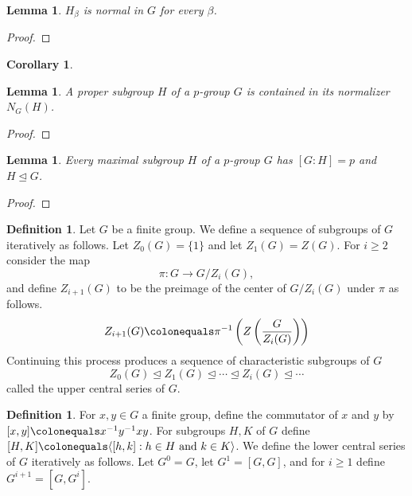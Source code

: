 \documentclass{dcthesis}
\newcommand{\defi}[1]{\textsf{#1}}
\numberwithin{equation}{section}
\newtheorem{lemma}[equation]{Lemma}
\newtheorem{corr}[equation]{Corollary}
\theoremstyle{definition}
\newtheorem{definition}[equation]{Definition}
\theoremstyle{remark}
\begin{document}
{{\begin{lemma}
      $H_\beta$ is normal in $G$ for every $\beta$.
    \end{lemma}
    \begin{proof}
    \end{proof}
    \begin{corr}
      \label{cor:normalsubgroupsofallorders}
    \end{corr}
    \begin{lemma}
      \label{lem:propersubgroupcontainedinnormalizer}
      A proper subgroup $H$ of a $p$-group $G$
      is contained in its normalizer $N_G(H)$.
    \end{lemma}
    \begin{proof}
    \end{proof}
    \begin{lemma}
      \label{lem:maximalsubgroup}
      Every maximal subgroup $H$ of a $p$-group $G$
      has $[G:H]=p$ and $H\trianglelefteq G$.
    \end{lemma}
    \begin{proof}
    \end{proof}
    \begin{definition}
      \label{def:uppercentralseries}
      Let $G$ be a finite group.
      We define a sequence of subgroups of $G$ iteratively as follows.
      Let $Z_0(G) = \{1\}$
      and let $Z_1(G) = Z(G)$.
      For $i\geq 2$ consider
      the map
      \[
        \pi\colon G\to G/Z_i(G),
      \]
      and define $Z_{i+1}(G)$ to be the preimage of the center of $G/Z_i(G)$ under $\pi$
      as follows.
      \[
        Z_{i+1}(G)\colonequals\pi^{-1}
        \left(Z\left(\frac{G}{Z_i(G)}\right)\right)
      \]
      Continuing this process produces a sequence of
      characteristic subgroups of $G$
      \[
        Z_0(G)\trianglelefteq Z_1(G)\trianglelefteq\cdots\trianglelefteq Z_{i}(G)\trianglelefteq\cdots
      \]
      called the \defi{upper central series} of $G$.
    \end{definition}
    \begin{definition}
      \label{def:lowercentralseries}
      For $x,y\in G$ a finite group,
      define the \defi{commutator of $x$ and $y$}
      by
      $[x,y]\colonequals x^{-1}y^{-1}xy$.
      For subgroups $H,K$ of $G$ define
      $[H,K]\colonequals\langle[h,k]:h\in H\text{ and }k\in K\rangle$.
      We define the \defi{lower central series} of $G$ iteratively as follows.
      Let $G^0=G$,
      let $G^1 = [G,G]$,
      and for $i\geq 1$ define
      $G^{i+1}=[G,G^i]$.
    \end{definition}
}}
\end{document}

